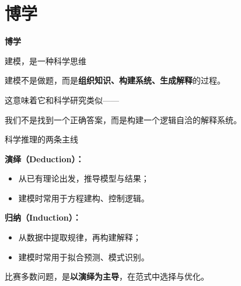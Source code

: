 \section{博学}



\begin{frame}[plain]
  \centering
  \vspace{3.5cm}
  {\color{techwhite}\Huge\bfseries 博学}
\end{frame}

\begin{frame}{\color{techwhite}建模，是一种科学思维}
\justifying
{\color{techwhite}
建模不是做题，而是\textbf{组织知识、构建系统、生成解释}的过程。

\vspace{0.5em}
这意味着它和科学研究类似——

我们不是找到一个正确答案，而是构建一个逻辑自洽的解释系统。
}
\end{frame}

\begin{frame}{\color{techwhite}科学推理的两条主线}
\justifying
{\color{techwhite}
\textbf{演绎（Deduction）：}
\begin{itemize}
  \item 从已有理论出发，推导模型与结果；
  \item 建模时常用于方程建构、控制逻辑。
\end{itemize}

\textbf{归纳（Induction）：}
\begin{itemize}
  \item 从数据中提取规律，再构建解释；
  \item 建模时常用于拟合预测、模式识别。
\end{itemize}

\vspace{0.5em}
比赛多数问题，是\textbf{以演绎为主导}，在范式中选择与优化。
}
\end{frame}

